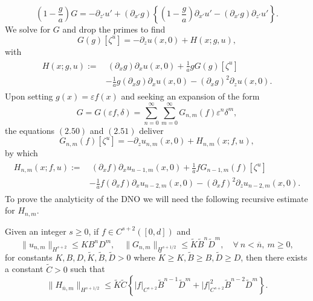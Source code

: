 $$\left(1-\frac{g}{a}\right)G=-\partial_{z'}u' +(\partial_{x'} g)\left\{\left(1-\frac{g}{a}\right)\partial_{x'} u' - (\partial_{x'}g)\partial_{z'} u' \right\}.$$
We solve for $G$ and drop the primes to find
\begin{equation}G(g)[\zeta^u] = -\partial_z u(x,0) + H(x;g,u),\end{equation}
with
\begin{align}
\begin{split}
H(x;g,u):=&~ (\partial_xg)\partial_x u(x,0)+\frac{1}{a}gG(g)[\zeta^u]\\&  - \frac{1}{a}g(\partial_x g)\partial_x u(x,0)  -(\partial_x g)^2\partial_z u(x,0). 
\end{split}
\end{align}
Upon setting $g(x)=\varepsilon f(x)$ and seeking an expansion of the form
$$G=G(\varepsilon f,\delta)=\sum_{n=0}^{\infty}\sum_{m=0}^{\infty}G_{n,m}(f)\varepsilon^n\delta^m,$$
the equations $(2.50)$ and $(2.51)$ deliver
\begin{equation}G_{n,m}(f)[\zeta^u]=-\partial_z u_{n,m}(x,0)+ H_{n,m}(x;f,u),\end{equation}
by which
\begin{align}
\begin{split}
H_{n,m}(x;f,u):=&~ (\partial_xf)\partial_x u_{n-1,m}(x,0)+\frac{1}{a}fG_{n-1,m}(f)[\zeta^u]\\&  - \frac{1}{a}f(\partial_x f)\partial_x u_{n-2,m}(x,0)  -(\partial_x f)^2\partial_z u_{n-2,m}(x,0). 
\end{split}
\end{align}
To prove the analyticity of the DNO we will need the following recursive estimate for $H_{n,m}$.
\vskip 0.1in
\begin{lemma} Given an integer $s\ge 0$, if $f\in C^{s+2}([0,d])$ and
\begin{equation}\|u_{n,m}\|_{H^{s+2}} \le KB^{n}D^{m}, \quad \|G_{n,m}\|_{H^{s+1/2}}\le \tilde{K}\tilde{B}^{n}\tilde{D}^{m},\quad \forall~ n < \overline{n},~m\ge 0,\end{equation}
for constants $K,B,D,\tilde{K},\tilde{B},\tilde{D} > 0$ where $\tilde{K}\ge K,\tilde{B}\ge B, \tilde{D}\ge D$, then there exists a constant $\tilde{C} > 0$ such that
\begin{equation}\|H_{\overline{n},m}\|_{H^{s+1/2}} \le \tilde{K}\tilde{C}\left\{|f|_{C^{s+2}}\tilde{B}^{n-1}\tilde{D}^{m}+ |f|_{C^{s+2}}^2\tilde{B}^{n-2}\tilde{D}^{m}\right\}.\end{equation}
\end{lemma}
\vskip 0.1in
